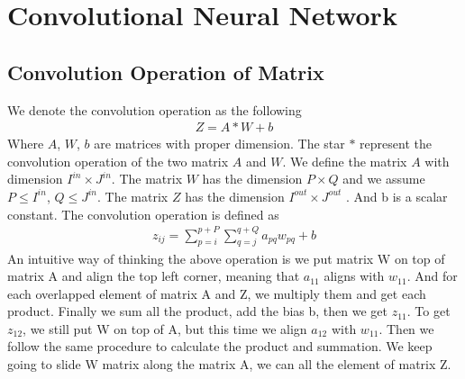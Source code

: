 \documentclass[a4paper]{article}
\begin{document}
\section{Convolutional Neural Network}
\subsection{Convolution Operation of Matrix}
We denote the convolution operation as the following
\begin{align*}
	Z= A*W +b
\end{align*}
Where $A$, $W$, $b$ are matrices with proper dimension. The star $*$ represent the convolution operation of the two matrix $A$ and $W$. We define the matrix $A$ with dimension $I^{in} \times J^{in}$. The matrix $W$ has the dimension $P \times Q$ and we assume $P \leq I^{in}$, $Q \leq J^{in}$. The matrix $Z$ has the dimension $I^{out} \times J^{out}$ . And b is a scalar constant. The convolution operation is defined as 
\begin{align*}
	z_{ij} = \sum_{p=i}^{p+P} \sum_{q=j}^{q+Q}  a_{pq} w_{pq} + b
\end{align*}
An intuitive way of thinking the above operation is we put matrix W on top of matrix A and align the top left corner, meaning that $a_{11}$ aligns with $w_{11}$. And for each overlapped element of matrix A and Z, we multiply them and get each product. Finally we sum all the product, add the bias b, then we get $z_{11}$. To get $z_{12}$, we still put W on top of A, but this time we align $a_{12}$ with $w_{11}$. Then we follow the same procedure to calculate the product and summation. We keep going to slide W matrix along the matrix A, we can all the element of matrix Z.  
\end{document}
